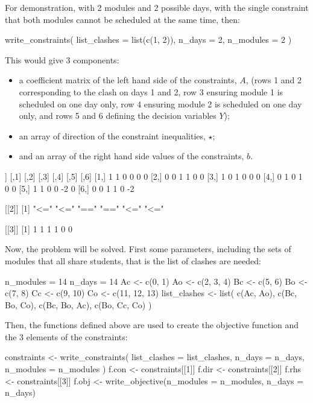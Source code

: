 For demonstration, with 2 modules and 2 possible days, with the single
constraint that both modules cannot be scheduled at the same time, then:

\begin{Rin-no-test}
write_constraints(
  list_clashes = list(c(1, 2)),
  n_days = 2,
  n_modules = 2
)
\end{Rin-no-test}

This would give 3 components:

\begin{itemize}
  \item a coefficient matrix of the left hand side of the constraints, \(A\), (rows 1
  and 2 corresponding to the clash on days 1 and 2, row 3 ensuring module 1 is
  scheduled on one day only, row 4 ensuring module 2 is scheduled on one day
  only, and rows 5 and 6 defining the decision variables \(Y\));
  \item an array of direction of the constraint inequalities, \(\star\);
  \item and an array of the right hand side values of the constraints, \(b\).
\end{itemize}

\begin{Rout-no-test}
[[1]]
     [,1] [,2] [,3] [,4] [,5] [,6]
[1,]    1    1    0    0    0    0
[2,]    0    0    1    1    0    0
[3,]    1    0    1    0    0    0
[4,]    0    1    0    1    0    0
[5,]    1    1    0    0   -2    0
[6,]    0    0    1    1    0   -2

[[2]]
[1] "<=" "<=" "==" "==" "<=" "<="

[[3]]
[1] 1 1 1 1 0 0
\end{Rout-no-test}

Now, the problem will be solved.
First some parameters, including the sets of modules that all share
students, that is the list of clashes are needed:

\begin{Rin-no-test}
n_modules = 14
n_days = 14
Ac <- c(0, 1)
Ao <- c(2, 3, 4)
Bc <- c(5, 6)
Bo <- c(7, 8)
Cc <- c(9, 10)
Co <- c(11, 12, 13)
list_clashes <- list(
  c(Ac, Ao),
  c(Bc, Bo, Co),
  c(Bc, Bo, Ac),
  c(Bo, Cc, Co)
)
\end{Rin-no-test}

Then, the functions defined above are used to create the objective function and
the 3 elements of the constraints:

\begin{Rin-no-test}
constraints <- write_constraints(
  list_clashes = list_clashes,
  n_days = n_days,
  n_modules = n_modules
)
f.con <- constraints[[1]]
f.dir <- constraints[[2]]
f.rhs <- constraints[[3]]
f.obj <- write_objective(n_modules = n_modules, n_days = n_days)
\end{Rin-no-test}

